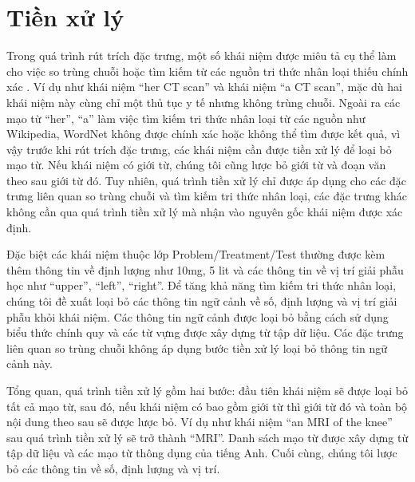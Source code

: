 \section{Tiền xử lý}
Trong quá trình rút trích đặc trưng, một số khái niệm được miêu tả cụ thể làm cho việc so trùng chuỗi hoặc tìm kiếm từ các nguồn tri thức nhân loại thiếu chính xác \cite{YanXu2012}. Ví dụ như khái niệm ``her CT scan'' và khái niệm ``a CT scan'', mặc dù hai khái niệm này cùng chỉ một thủ tục y tế nhưng không trùng chuỗi. Ngoài ra các mạo từ ``her'', ``a'' làm việc tìm kiếm tri thức nhân loại từ các nguồn như Wikipedia, WordNet không được chính xác hoặc không thể tìm được kết quả, vì vậy trước khi rút trích đặc trưng, các khái niệm cần được tiền xử lý để loại bỏ mạo từ. Nếu khái niệm có giới từ, chúng tôi cũng lược bỏ giới từ và đoạn văn theo sau giới từ đó. Tuy nhiên, quá trình tiền xử lý chỉ được áp dụng cho các đặc trưng liên quan so trùng chuỗi và tìm kiếm tri thức nhân loại, các đặc trưng khác không cần qua quá trình tiền xử lý mà nhận vào nguyên gốc khái niệm được xác định.

Đặc biệt các khái niệm thuộc lớp Problem/Treatment/Test thường được kèm thêm thông tin về định lượng như 10mg, 5 lit và các thông tin về vị trí giải phẫu học như ``upper'', ``left'', ``right''. Để tăng khả năng tìm kiếm tri thức nhân loại, chúng tôi đề xuất loại bỏ các thông tin ngữ cảnh về số, định lượng và vị trí giải phẫu khỏi khái niệm. Các thông tin ngữ cảnh được loại bỏ bằng cách sử dụng biểu thức chính quy và các từ vựng được xây dựng từ tập dữ liệu. Các đặc trưng liên quan so trùng chuỗi không áp dụng bước tiền xử lý loại bỏ thông tin ngữ cảnh này.

Tổng quan, quá trình tiền xử lý gồm hai bước: đầu tiên khái niệm sẽ được loại bỏ tất cả mạo từ, sau đó, nếu khái niệm có bao gồm giới từ thì giới từ đó và toàn bộ nội dung theo sau sẽ được lược bỏ. Ví dụ như khái niệm “an MRI of the knee” sau quá trình tiền xử lý sẽ trở thành “MRI”. Danh sách mạo từ được xây dựng từ tập dữ liệu và các mạo từ thông dụng của tiếng Anh. Cuối cùng, chúng tôi lược bỏ các thông tin về số, định lượng và vị trí.

